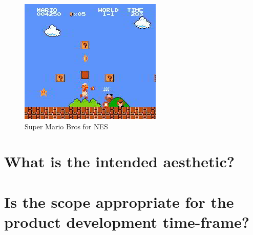 \documentclass{scrartcl}
\begin{document}
\begin{figure}[]
	\includegraphics[width=0.5\linewidth]{mario.JPG}
	\caption{Super Mario Bros for NES }
\end{figure}



\section{What is the intended aesthetic?}


\section{Is the scope appropriate for the product development time-frame?}

	
\end{document}
